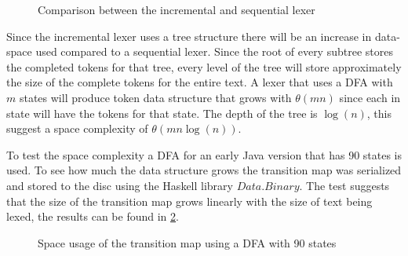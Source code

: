 \begin{figure}[!h]
\caption{Comparison between the incremental and sequential lexer\label{fig:IncSeqTime}}
\end{figure}

Since the incremental lexer uses a tree structure there will be an increase in
data-space used compared to a sequential lexer. Since the root of every subtree
stores the completed tokens for that tree, every level of the tree will store
approximately the size of the complete tokens for the entire text. A lexer that
uses a DFA with $m$ states will produce token data structure that grows with
$\theta(mn)$ since each in state will have the tokens for that state. The depth
of the tree is $\log(n)$, this suggest a space complexity of
$\theta(mn\log(n))$.

To test the space complexity a DFA for an early Java version that has 90 states
is used. To see how much the data structure grows the transition map was
serialized and stored to the disc using the Haskell library $Data.Binary$. The
test suggests that the size of the transition map grows linearly with the size
of text being lexed, the results can be found in \cref{fig:IncSpace}.

\begin{figure}[!h]
\caption{Space usage of the transition map using a DFA with 90 states\label{fig:IncSpace}}
\end{figure}


